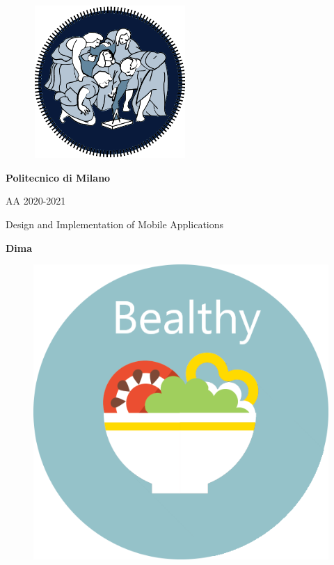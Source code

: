 \documentclass [12pt]{article}
\begin{document}
\begin{figure}[ht!]
\centering
\includegraphics[height=5.8cm,width=5.8cm]{logopoli.png}
\end{figure}
\begin{large}
\centerline{\textbf{Politecnico di Milano} }
\centerline{AA 2020-2021}
\vspace{0.5cm}
\centerline{Design and Implementation of Mobile Applications}
\centerline{\textbf{Dima}}
\end{large}
\begin{figure}[ht!]
\centering
\includegraphics[width=\linewidth]{Immaginecopertina.png}
\end{figure} 

\clearpage
\end{document}
